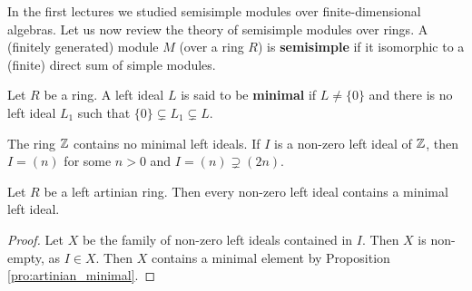 In the first lectures we studied semisimple modules over finite-dimensional 
algebras. Let us now review the theory of semisimple modules over rings. 
A (finitely generated) module $M$ (over a ring $R$) is \textbf{semisimple} 
if it isomorphic to a (finite) direct sum of simple modules. 

\begin{definition}
    Let $R$ be a ring. A left ideal $L$ is said to be \textbf{minimal}
    if $L\ne\{0\}$ and there is no left ideal $L_1$
    such that $\{0\}\subsetneq L_1\subsetneq L$.
\end{definition}

The ring $\mathbb{Z}$ contains no minimal left ideals. If $I$ is a non-zero 
left ideal of $\mathbb{Z}$, then
$I=(n)$ for some $n>0$ and $I=(n)\supsetneq (2n)$. 

\begin{proposition}
    Let $R$ be a left artinian ring. 
    Then every non-zero left ideal contains a minimal left ideal. 
\end{proposition}

\begin{proof}
    Let $X$ be the family of non-zero left ideals contained in $I$. Then $X$ is non-empty, as 
    $I\in X$. Then $X$ contains a minimal element by Proposition \ref{pro:artinian_minimal}. 
\end{proof}



